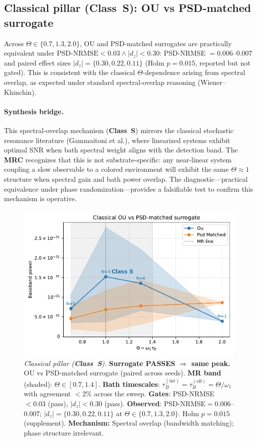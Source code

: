 \documentclass[11pt,letterpaper]{article}
\DeclareRobustCommand{\mrc}{\textbf{MRC}\xspace}
\DeclareRobustCommand{\classS}{\textbf{Class~S}\xspace}
\DeclareRobustCommand{\GatePSD}{\ensuremath{\text{PSD-NRMSE}<0.03}\xspace}
\DeclareRobustCommand{\GateDZ}{\ensuremath{\lvert d_z\rvert<0.30}\xspace}
\DeclareRobustCommand{\GateEQ}{\ensuremath{\GatePSD \wedge \GateDZ}\xspace}
\begin{document}
\subsection{Classical pillar (\classS): OU vs PSD-matched surrogate}
\label{sec:results_classical}
Across $\Theta\in\{0.7,1.3,2.0\}$, OU and PSD-matched surrogates are practically equivalent under \GateEQ: PSD-NRMSE $=0.006$--$0.007$ and paired effect sizes $|d_z|=\{0.30,0.22,0.11\}$ (Holm $p=0.015$, reported but not gated). This is consistent with the classical $\Theta$-dependence arising from spectral overlap, as expected under standard spectral-overlap reasoning (Wiener--Khinchin).

\paragraph*{Synthesis bridge.} This spectral-overlap mechanism (\classS) mirrors the classical stochastic resonance literature (Gammaitoni et al.), where linearized systems exhibit optimal SNR when bath spectral weight aligns with the detection band. The \mrc recognizes that this is not substrate-specific: any near-linear system coupling a slow observable to a colored environment will exhibit the same $\Theta\!\approx\!1$ structure when spectral gain and bath power overlap. The diagnostic---practical equivalence under phase randomization---provides a falsifiable test to confirm this mechanism is operative.

\begin{figure}[t]
\centering
\includegraphics[width=0.8\linewidth]{figA_classical.pdf}
\caption{\emph{Classical pillar (\classS).} \textbf{Surrogate PASSES $\Rightarrow$ same peak.} OU vs PSD-matched surrogate (paired across seeds). \textbf{MR band} (shaded): $\Theta\in[0.7,1.4]$. \textbf{Bath timescales}: $\tau_B^{(\mathrm{int})}=\tau_B^{(\mathrm{eff})}=\Theta/\omega_1$ with agreement $<2\%$ across the sweep. \textbf{Gates}: PSD-NRMSE$<0.03$ (pass), $|d_z|<0.30$ (pass). \textbf{Observed}: PSD-NRMSE$=0.006$--$0.007$; $|d_z|=\{0.30,0.22,0.11\}$ at $\Theta\in\{0.7,1.3,2.0\}$. Holm $p=0.015$ (supplement). \textbf{Mechanism:} Spectral overlap (bandwidth matching); phase structure irrelevant.}
\end{figure}
\end{document}

